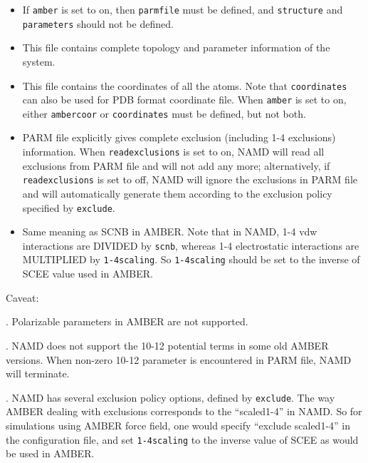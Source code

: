 \begin{itemize}

\item
{}
{
If {\tt amber} is set to on, then {\tt parmfile} must be defined,
and {\tt structure} and {\tt parameters} should not be defined.
}

\item
{}
{
This file contains complete topology and parameter information of
the system.
}

\item
{}
{
This file contains the coordinates of all the atoms. Note that
{\tt coordinates} can also be used for PDB format coordinate
file. When {\tt amber} is set to on, either {\tt ambercoor}
or {\tt coordinates} must be defined, but not both.
}

\item
{}
{
PARM file explicitly gives complete exclusion (including 1-4
exclusions) information. When {\tt readexclusions} is set to on,
NAMD will read all exclusions from PARM file and will not add any
more; alternatively, if {\tt readexclusions} is set to
off, NAMD will ignore the exclusions in PARM file and will
automatically generate them according to the
exclusion policy specified by {\tt exclude}.
}

\item
{}
{
Same meaning as SCNB in AMBER. Note that in NAMD, 1-4 vdw
interactions are DIVIDED by {\tt scnb}, whereas 1-4 electrostatic
interactions are MULTIPLIED by {\tt 1-4scaling}. So
{\tt 1-4scaling} should be set to the inverse of SCEE value used
in AMBER.
}

\end{itemize}

\noindent Caveat:

. Polarizable parameters in AMBER are not supported.

. NAMD does not support the 10-12 potential terms in
some old AMBER versions. When non-zero 10-12 parameter is
encountered in PARM file, NAMD will terminate.

. NAMD has several exclusion policy options, defined
by {\tt exclude}. The way AMBER dealing with exclusions
corresponds to the ``scaled1-4'' in NAMD. So for simulations using
AMBER force field, one would specify ``exclude scaled1-4'' in the
configuration file, and set {\tt 1-4scaling} to the inverse value
of SCEE as would be used in AMBER.

